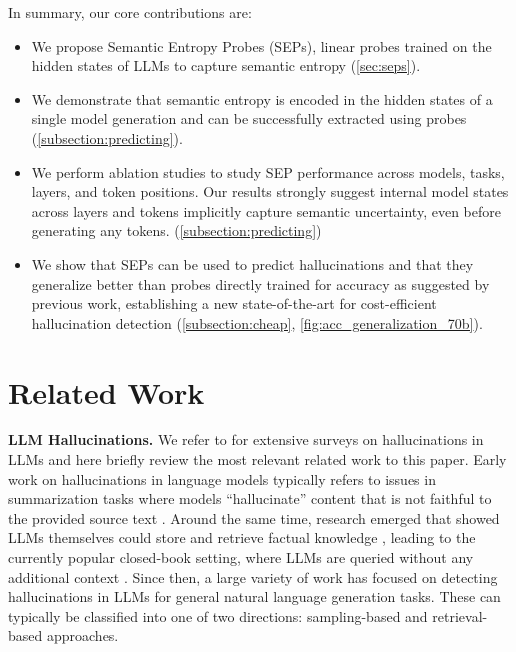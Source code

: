 \documentclass{article}
\begin{document}
In summary, our core contributions are:
\begin{itemize}[topsep=0pt,itemsep=0pt]  
\setlength\itemsep{0em}
    \item We propose Semantic Entropy Probes (SEPs), linear probes trained on the hidden states of LLMs to capture semantic entropy (\cref{sec:seps}).
    \item We demonstrate that semantic entropy is encoded in the hidden states of a single model generation and can be successfully extracted using probes (\cref{subsection:predicting}).
    \item We perform ablation studies to study SEP performance across models, tasks, layers, and token positions.
    Our results strongly suggest internal model states across layers and tokens implicitly capture semantic uncertainty, even before generating any tokens. (\cref{subsection:predicting})
    \item We show that SEPs can be used to predict hallucinations and that they generalize better than probes directly trained for accuracy as suggested by previous work, establishing a new state-of-the-art for cost-efficient hallucination detection (\cref{subsection:cheap}, \cref{fig:acc_generalization_70b}).
\end{itemize}


\section{Related Work}
\label{sec:related_work}
\vspace{-1.5mm}

\textbf{LLM Hallucinations.}
We refer to \citet{rawte2023survey,zhang2023siren} for extensive surveys on hallucinations in LLMs and here briefly review the most relevant related work to this paper.
Early work on hallucinations in language models typically refers to issues in summarization tasks where models ``hallucinate'' content that is not faithful to the provided source text \citep{maynez2020faithfulness,deutsch2021towards,durmus2020feqa,cao2021hallucinated,wang2020asking,manakul2023mqag,nan2021improving}.
Around the same time, research emerged that showed LLMs themselves could store and retrieve factual knowledge \citep{petroni2019language}, leading to the currently popular closed-book setting, where LLMs are queried without any additional context \citep{roberts2020much}.
Since then, a large variety of work has focused on detecting hallucinations in LLMs for general natural language generation tasks.
These can typically be classified into one of two directions: sampling-based and retrieval-based approaches.
\end{document}
